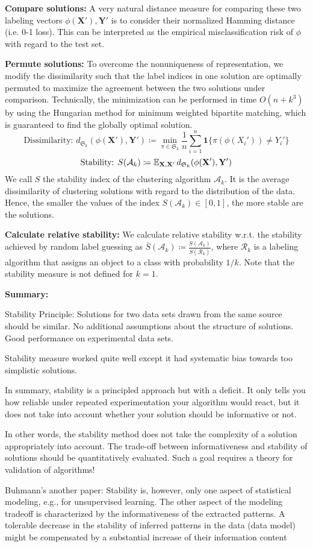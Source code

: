 \documentclass[12pt]{article}
\begin{document}
\item \textbf{Compare solutions:} A very natural distance measure for comparing these two labeling vectors $\phi(\mathbf{X}'),\mathbf{Y}'$ is to consider their normalized Hamming distance (i.e. 0-1 loss). This can be interpreted as the empirical misclassification risk of $\phi$ with regard to the test set.
\item \textbf{Permute solutions:} To overcome the nonuniqueness of representation, we modify the dissimilarity such that the label indices in one solution are optimally permuted to maximize the agreement between the two solutions under comparison. Technically, the minimization can be performed in time $O(n+k^3)$ by using the Hungarian method for minimum weighted bipartite matching, which is guaranteed to find the globally optimal solution.
\[ \text{Dissimilarity: } d_{\mathfrak S_k} (\phi(\mathbf{X}'),\mathbf{Y}')\coloneqq \min_{\pi \in \mathfrak S_k}\frac{1}{n}\sum_{i=1}^n \mathbf{1}\{ \pi(\phi(X_i')) \neq Y_i' \} \]
\[ \text{Stability: } S(\mathcal{A}_k) \coloneqq \operatorname{\mathbb{E}}_{\mathbf{X,X'}} d_{\mathfrak{S}_k}(\phi(\mathbf{X}'),\mathbf{Y}') \]
We call $S$ the stability index of the clustering algorithm $\mathcal{A}_k$. It is the average dissimilarity of clustering solutions with regard to the distribution of the data. Hence, the smaller the values of the index $S(\mathcal{A}_k)\in [0,1]$, the more stable are the solutions.
\item \textbf{Calculate relative stability:} We calculate relative stability w.r.t. the stability achieved by random label guessing as $\bar{S}(\mathcal{A}_k) \coloneqq \frac{S(\mathcal{A}_k)}{S(\mathcal{R}_k)}$, where $\mathcal{R}_k$ is a labeling algorithm that assigns an object to a class with probability $1/k$. Note that the stability measure is not defined for $k = 1$.
\ole
\par \textbf{Summary:}
\ulb
\item Stability Principle: Solutions for two data sets drawn from the same source should be similar. No additional assumptions about the structure of solutions. Good performance on experimental data sets.
\item Stability measure worked quite well except it had systematic bias towards too simplistic solutions.
\item In summary, stability is a principled approach but with a deficit. It only tells you how reliable under repeated experimentation your algorithm would react, but it does not take into account whether your solution should be informative or not.
\item In other words, the stability method does not take the complexity of a solution appropriately into account. The trade-off between informativeness and stability of solutions should be quantitatively evaluated. Such a goal requires a theory for validation of algorithms!
\item Buhmann's another paper: Stability is, however, only one aspect of statistical modeling, e.g., for unsupervised learning. The other aspect of the modeling tradeoff is characterized by the informativeness of the extracted patterns. A tolerable decrease in the stability of inferred patterns in the data (data model) might be compensated by a substantial increase of their
information content
\ule
\end{document}
